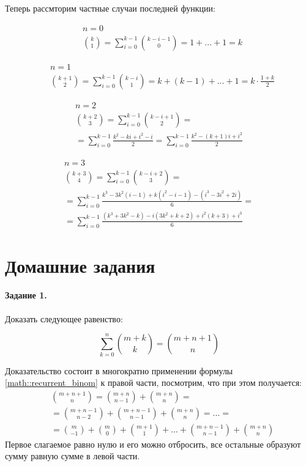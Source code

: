Теперь рассмторим частные случаи последней функции:

\begin{equation}
	\begin{split}
		& n = 0 \\
		& \binom{k}{1} = \sum_{i=0}^{k-1} \binom{k-i-1}{0} = 1 + ... + 1 = k
	\end{split}
\end{equation}

\begin{equation}
	\begin{split}
		& n = 1 \\
		& \binom{k+1}{2} = \sum_{i=0}^{k-1} \binom{k-i}{1} = k + (k-1) + ... + 1 = k \cdot \frac{1+k}{2}
	\end{split}
\end{equation}

\begin{multline}
	n = 2 \\
	\binom{k+2}{3} = \sum_{i=0}^{k-1} \binom{k-i+1}{2} = \\
	= \sum_{i=0}^{k-1} \frac{k^2 - k i + i^2 - i}{2} = \sum_{i=0}^{k-1} \frac{k^2 - (k + 1) i + i^2}{2}
\end{multline}

\begin{multline}
	n = 3 \\
	\binom{k+3}{4} = \sum_{i=0}^{k-1} \binom{k-i+2}{3} = \\
	= \sum_{i=0}^{k-1} \frac{k^3-3k^2(i-1)+k(i^2-i-1)-(i^3-3i^2+2i)}{6} = \\ = \sum_{i=0}^{k-1} \frac{(k^3+3k^2-k)-i(3k^2+k+2)+i^2(k+3)+i^3}{6}
\end{multline}

\section{Домашние задания}

\paragraph{Задание 1.} Доказать следующее равенство:

\begin{equation}
	\sum_{k=0}^n \binom{m+k}{k} = \binom{m+n+1}{n}
\end{equation}

\begin{Proof}
	Доказательство состоит в многократно применении формулы \ref{math::recurrent_binom} к правой части, посмотрим, что при этом получается:
	\[
		\begin{split}
			& \binom{m+n+1}{n} = \binom{m+n}{n-1} + \binom{m+n}{n} = \\ 
			& = \binom{m+n-1}{n-2} + \binom{m+n-1}{n-1} + \binom{m+n}{n} = ... = \\
			& = \binom{m}{-1} + \binom{m}{0} + \binom{m+1}{1} + ... + \binom{m+n-1}{n-1} + \binom{m+n}{n}
		\end{split}
	\]
	Первое слагаемое равно нулю и его можно отбросить, все остальные образуют сумму равную сумме в левой части.
\end{Proof}

